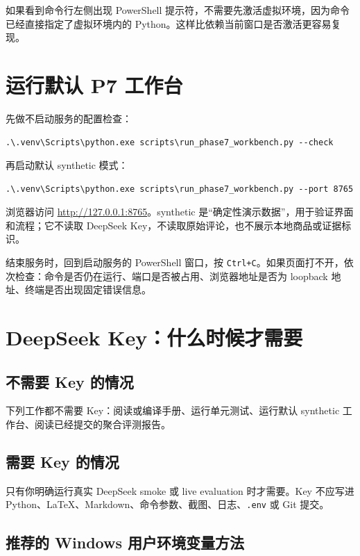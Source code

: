 如果看到命令行左侧出现 PowerShell 提示符，不需要先激活虚拟环境，因为命令已经直接指定了虚拟环境内的 Python。这样比依赖当前窗口是否激活更容易复现。

\section{运行默认 P7 工作台}

先做不启动服务的配置检查：

\begin{lstlisting}[language={}]
.\.venv\Scripts\python.exe scripts\run_phase7_workbench.py --check
\end{lstlisting}

再启动默认 synthetic 模式：

\begin{lstlisting}[language={}]
.\.venv\Scripts\python.exe scripts\run_phase7_workbench.py --port 8765
\end{lstlisting}

浏览器访问 \url{http://127.0.0.1:8765}。synthetic 是“确定性演示数据”，用于验证界面和流程；它不读取 DeepSeek Key，不读取原始评论，也不展示本地商品或证据标识。

结束服务时，回到启动服务的 PowerShell 窗口，按 \texttt{Ctrl+C}。如果页面打不开，依次检查：命令是否仍在运行、端口是否被占用、浏览器地址是否为 loopback 地址、终端是否出现固定错误信息。

\section{DeepSeek Key：什么时候才需要}

\subsection{不需要 Key 的情况}

下列工作都不需要 Key：阅读或编译手册、运行单元测试、运行默认 synthetic 工作台、阅读已经提交的聚合评测报告。

\subsection{需要 Key 的情况}

只有你明确运行真实 DeepSeek smoke 或 live evaluation 时才需要。Key 不应写进 Python、LaTeX、Markdown、命令参数、截图、日志、\texttt{.env} 或 Git 提交。

\subsection{推荐的 Windows 用户环境变量方法}

